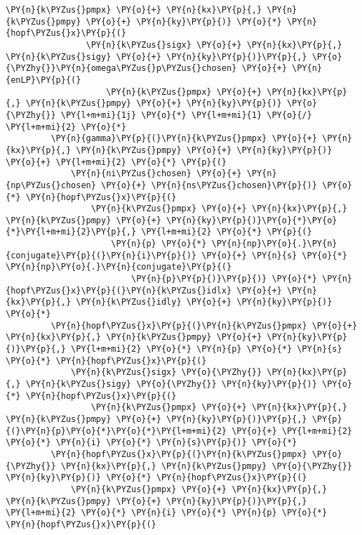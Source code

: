 \begin{Verbatim}[commandchars=\\\{\}]
            \PY{n}{k\PYZus{}pmpx} \PY{o}{+} \PY{n}{kx}\PY{p}{,} \PY{n}{k\PYZus{}pmpy} \PY{o}{+} \PY{n}{ky}\PY{p}{)} \PY{o}{*} \PY{n}{hopf\PYZus{}x}\PY{p}{(}
                \PY{n}{k\PYZus{}sigx} \PY{o}{+} \PY{n}{kx}\PY{p}{,} \PY{n}{k\PYZus{}sigy} \PY{o}{+} \PY{n}{ky}\PY{p}{)}\PY{p}{,} \PY{o}{\PYZhy{}}\PY{n}{omega\PYZus{}p\PYZus{}chosen} \PY{o}{+} \PY{n}{enLP}\PY{p}{(}
                    \PY{n}{k\PYZus{}pmpx} \PY{o}{+} \PY{n}{kx}\PY{p}{,} \PY{n}{k\PYZus{}pmpy} \PY{o}{+} \PY{n}{ky}\PY{p}{)} \PY{o}{\PYZhy{}} \PY{l+m+mi}{1j} \PY{o}{*} \PY{l+m+mi}{1} \PY{o}{/} \PY{l+m+mi}{2} \PY{o}{*}
         \PY{n}{gamma}\PY{p}{(}\PY{n}{k\PYZus{}pmpx} \PY{o}{+} \PY{n}{kx}\PY{p}{,} \PY{n}{k\PYZus{}pmpy} \PY{o}{+} \PY{n}{ky}\PY{p}{)} \PY{o}{+} \PY{l+m+mi}{2} \PY{o}{*} \PY{p}{(}
             \PY{n}{ni\PYZus{}chosen} \PY{o}{+} \PY{n}{np\PYZus{}chosen} \PY{o}{+} \PY{n}{ns\PYZus{}chosen}\PY{p}{)} \PY{o}{*} \PY{n}{hopf\PYZus{}x}\PY{p}{(}
                 \PY{n}{k\PYZus{}pmpx} \PY{o}{+} \PY{n}{kx}\PY{p}{,} \PY{n}{k\PYZus{}pmpy} \PY{o}{+} \PY{n}{ky}\PY{p}{)}\PY{o}{*}\PY{o}{*}\PY{l+m+mi}{2}\PY{p}{,} \PY{l+m+mi}{2} \PY{o}{*} \PY{p}{(}
                     \PY{n}{p} \PY{o}{*} \PY{n}{np}\PY{o}{.}\PY{n}{conjugate}\PY{p}{(}\PY{n}{i}\PY{p}{)} \PY{o}{+} \PY{n}{s} \PY{o}{*} \PY{n}{np}\PY{o}{.}\PY{n}{conjugate}\PY{p}{(}
                         \PY{n}{p}\PY{p}{)}\PY{p}{)} \PY{o}{*} \PY{n}{hopf\PYZus{}x}\PY{p}{(}\PY{n}{k\PYZus{}idlx} \PY{o}{+} \PY{n}{kx}\PY{p}{,} \PY{n}{k\PYZus{}idly} \PY{o}{+} \PY{n}{ky}\PY{p}{)} \PY{o}{*}
         \PY{n}{hopf\PYZus{}x}\PY{p}{(}\PY{n}{k\PYZus{}pmpx} \PY{o}{+} \PY{n}{kx}\PY{p}{,} \PY{n}{k\PYZus{}pmpy} \PY{o}{+} \PY{n}{ky}\PY{p}{)}\PY{p}{,} \PY{l+m+mi}{2} \PY{o}{*} \PY{n}{p} \PY{o}{*} \PY{n}{s} \PY{o}{*} \PY{n}{hopf\PYZus{}x}\PY{p}{(}
             \PY{n}{k\PYZus{}sigx} \PY{o}{\PYZhy{}} \PY{n}{kx}\PY{p}{,} \PY{n}{k\PYZus{}sigy} \PY{o}{\PYZhy{}} \PY{n}{ky}\PY{p}{)} \PY{o}{*} \PY{n}{hopf\PYZus{}x}\PY{p}{(}
                 \PY{n}{k\PYZus{}pmpx} \PY{o}{+} \PY{n}{kx}\PY{p}{,} \PY{n}{k\PYZus{}pmpy} \PY{o}{+} \PY{n}{ky}\PY{p}{)}\PY{p}{,} \PY{p}{(}\PY{n}{p}\PY{o}{*}\PY{o}{*}\PY{l+m+mi}{2} \PY{o}{+} \PY{l+m+mi}{2} \PY{o}{*} \PY{n}{i} \PY{o}{*} \PY{n}{s}\PY{p}{)} \PY{o}{*}
         \PY{n}{hopf\PYZus{}x}\PY{p}{(}\PY{n}{k\PYZus{}pmpx} \PY{o}{\PYZhy{}} \PY{n}{kx}\PY{p}{,} \PY{n}{k\PYZus{}pmpy} \PY{o}{\PYZhy{}} \PY{n}{ky}\PY{p}{)} \PY{o}{*} \PY{n}{hopf\PYZus{}x}\PY{p}{(}
             \PY{n}{k\PYZus{}pmpx} \PY{o}{+} \PY{n}{kx}\PY{p}{,} \PY{n}{k\PYZus{}pmpy} \PY{o}{+} \PY{n}{ky}\PY{p}{)}\PY{p}{,} \PY{l+m+mi}{2} \PY{o}{*} \PY{n}{i} \PY{o}{*} \PY{n}{p} \PY{o}{*} \PY{n}{hopf\PYZus{}x}\PY{p}{(}

\end{Verbatim}
